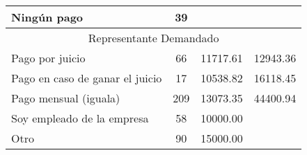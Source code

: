 \begin{tabular}{rrrr}
\multicolumn{1}{l}{Ningún pago} & \multicolumn{1}{c}{39} & \multicolumn{1}{c}{} & \multicolumn{1}{c}{} \\
\midrule
\multicolumn{4}{c}{Representante Demandado} \\
\midrule
\multicolumn{1}{l}{Pago por juicio} & \multicolumn{1}{c}{66} & \multicolumn{1}{c}{11717.61} & \multicolumn{1}{c}{12943.36} \\
\multicolumn{1}{l}{Pago en caso de ganar el juicio} & \multicolumn{1}{c}{17} & \multicolumn{1}{c}{10538.82} & \multicolumn{1}{c}{16118.45} \\
\multicolumn{1}{l}{Pago mensual (iguala)} & \multicolumn{1}{c}{209} & \multicolumn{1}{c}{13073.35} & \multicolumn{1}{c}{44400.94} \\
\multicolumn{1}{l}{Soy empleado de la empresa} & \multicolumn{1}{c}{58} & \multicolumn{1}{c}{10000.00} & \multicolumn{1}{c}{} \\
\multicolumn{1}{l}{Otro} & \multicolumn{1}{c}{90} & \multicolumn{1}{c}{15000.00} & \multicolumn{1}{c}{} \\
\bottomrule
\end{tabular}%
